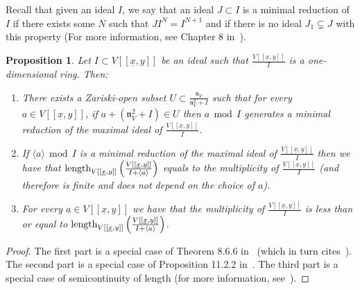 \documentclass{article}
\newtheorem{proposition}[theorem]{Proposition}
\newcommand{\naxV}{\mathfrak{n}_V}
\newcommand{\Vxy}{V[[\underline{x},y]]}
\numberwithin{theorem}{section}
\renewcommand{\mod}{\,\operatorname{mod}\,}
\begin{document}
Recall that given an ideal $I$, we say that an ideal $J \subset I$ is a minimal reduction of $I$ if there exists some $N$ such that $JI^N = I^{N+1}$ and if there is no ideal $J_1 \subsetneq J$ with this property (For more information, see Chapter 8 in~\cite{huneke2006integral}).  

\begin{proposition}\label{prop:generic_intersection}
    Let $I \subset \Vxy$ be an ideal such that $\frac{\Vxy}{I}$ is a one-dimensional ring. Then:
    \begin{enumerate}
        \item There exists a Zariski-open subset $U \subset \frac{\naxV}{\naxV^2 + I}$ such that for every $a \in \Vxy$, if $a + \left(\naxV^2 + I\right) \in U$ then $a \mod    I$ generates a minimal reduction of the maximal ideal of $\frac{\Vxy}{I}$. 
        \item If $\langle a \rangle \mod I$ is a minimal reduction of the maximal ideal of $\frac{\Vxy}{I}$ then we have that  $\textup{length}_{\Vxy}\left(\frac{\Vxy}{I+\langle a \rangle}\right)$ equals to the multiplicity of  $\frac{\Vxy}{I}$ (and therefore is finite and does not depend on the choice of $a$). 
        \item For every $a \in \Vxy$ we have that the multiplicity of $\frac{\Vxy}{I}$ is less than or equal to  $\textup{length}_{\Vxy}\left(\frac{\Vxy}{I+\langle a \rangle}\right)$.
    \end{enumerate}
\end{proposition}
\begin{proof}
    The first part is a special case of Theorem 8.6.6 in~\cite{huneke2006integral} (which in turn cites~\cite{northcott1954reductions, trung2003constructive}). The second part is a special case of Proposition 11.2.2 in~\cite{huneke2006integral}. The third part is a special case of semicontinuity of length (for more information, see~\cite{504741}).
\end{proof}
\end{document}
